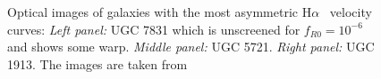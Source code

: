 \documentclass{emulateapj}
\newcommand{\ha}{H$\alpha$}
\begin{document}
\begin{figure}
\caption{Optical images of  galaxies with the most asymmetric \ha~
velocity curves: {\it Left panel:} 
UGC 7831 which is unscreened for $f_{R0}=10^{-6}$ and shows some warp.  
{\it Middle panel:} UGC 5721. {\it Right panel:} UGC 1913. 
The images are taken from \citet{figgs2008}
\label{fig:eg-image-2}}
\end{figure}
\end{document}
